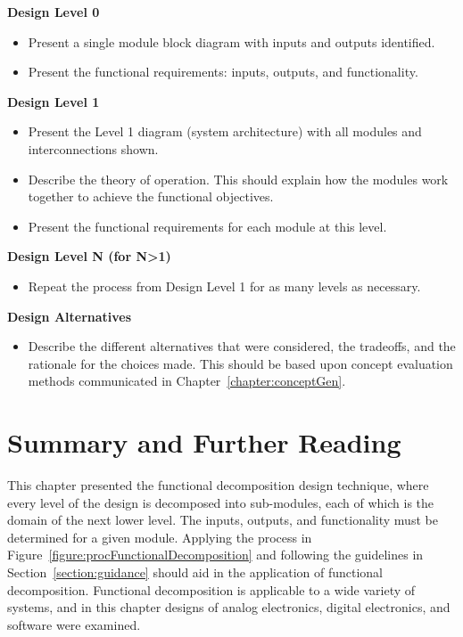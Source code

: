 \textbf{Design Level 0}
\begin{itemize}
\item  Present a single module block diagram with inputs and outputs
  identified.
\item  Present the functional requirements: inputs, outputs, and
  functionality.
\end{itemize}


\textbf{Design Level 1}
\begin{itemize}
\item
  Present the Level 1 diagram (system architecture) with all modules and
  interconnections shown.
\item
  Describe the theory of operation. This should explain how the modules
  work together to achieve the functional objectives.
\item
  Present the functional requirements for each module at this level.
\end{itemize}


\textbf{Design Level N (for N\textgreater1)}
\begin{itemize}
\item
  Repeat the process from Design Level 1 for as many levels as
  necessary.
\end{itemize}

\textbf{Design Alternatives}
\begin{itemize}
\item
  Describe the different alternatives that were considered, the
  tradeoffs, and the rationale for the choices made. This should be
  based upon concept evaluation methods communicated in 
  Chapter~\ref{chapter:conceptGen}.
\end{itemize}

\section{Summary and Further Reading}
\label{section:funcDecomSummary-and-further-reading}

This chapter presented the functional decomposition design technique,
where every level of the design is decomposed into sub-modules, each of
which is the domain of the next lower level. The inputs, outputs, and
functionality must be determined for a given module. Applying the
process in Figure~\ref{figure:procFunctionalDecomposition}
and following the guidelines in Section~\ref{section:guidance} should
aid in the application of functional decomposition. Functional
decomposition is applicable to a wide variety of systems, and in this
chapter designs of analog electronics, digital electronics, and software
were examined.


